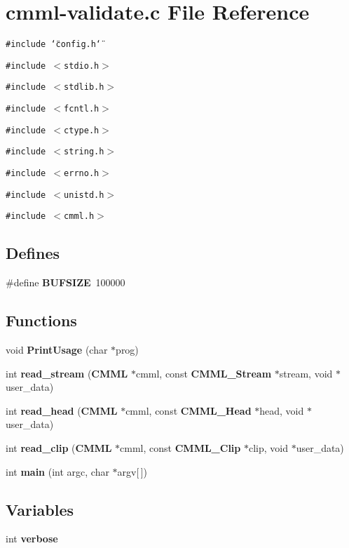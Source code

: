 \section{cmml-validate.c File Reference}
\label{cmml-validate_8c}
{\tt \#include \char`\"{}config.h\char`\"{}}\par
{\tt \#include $<$stdio.h$>$}\par
{\tt \#include $<$stdlib.h$>$}\par
{\tt \#include $<$fcntl.h$>$}\par
{\tt \#include $<$ctype.h$>$}\par
{\tt \#include $<$string.h$>$}\par
{\tt \#include $<$errno.h$>$}\par
{\tt \#include $<$unistd.h$>$}\par
{\tt \#include $<$cmml.h$>$}\par
\subsection*{Defines}
\begin{CompactItemize}
\item 
\#define {\bf BUFSIZE}\ 100000
\end{CompactItemize}
\subsection*{Functions}
\begin{CompactItemize}
\item 
void {\bf Print\-Usage} (char $\ast$prog)
\item 
int {\bf read\_\-stream} ({\bf CMML} $\ast$cmml, const {\bf CMML\_\-Stream} $\ast$stream, void $\ast$user\_\-data)
\item 
int {\bf read\_\-head} ({\bf CMML} $\ast$cmml, const {\bf CMML\_\-Head} $\ast$head, void $\ast$user\_\-data)
\item 
int {\bf read\_\-clip} ({\bf CMML} $\ast$cmml, const {\bf CMML\_\-Clip} $\ast$clip, void $\ast$user\_\-data)
\item 
int {\bf main} (int argc, char $\ast$argv[$\,$])
\end{CompactItemize}
\subsection*{Variables}
\begin{CompactItemize}
\item 
int {\bf verbose}
\end{CompactItemize}


